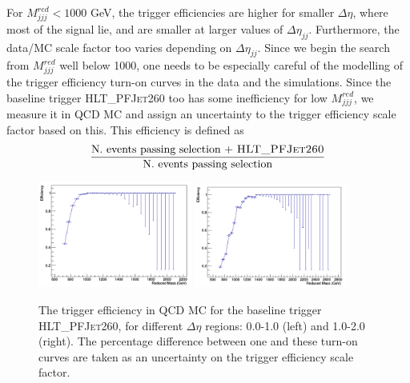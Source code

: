 For $M_{jjj}^{red} < 1000$ GeV, the trigger efficiencies are higher for smaller $\Delta\eta$, where most of the signal lie, and are smaller at larger values of $\Delta\eta_{jj}$. Furthermore, the data/MC scale factor too varies depending on $\Delta\eta_{jj}$. Since we begin the search from $M_{jjj}^{red}$ well below 1000\GeV, one needs to be especially careful of the modelling of the trigger efficiency turn-on curves in the data and the simulations. Since the baseline trigger \textsc{HLT\_PFJet260} too has some inefficiency for low $M_{jjj}^{red}$, we measure it in QCD MC and assign an uncertainty to the trigger efficiency scale factor based on this. This efficiency is defined as
\begin{equation}
\frac{\text{N. events passing selection + \textsc{HLT\_PFJet260}}}{\text{N. events passing selection}}
\end{equation}
\begin{figure}[h]
  \begin{center}  
    \includegraphics[width=0.45\textwidth]{F5/QCDDeta0v2.pdf} 
    \includegraphics[width=0.45\textwidth]{F5/QCDDeta1v2.pdf} 
  \end{center}
  \caption{The trigger efficiency in QCD MC for the baseline trigger \textsc{HLT\_PFJet260}, for different $\Delta\eta$ regions: 0.0-1.0 (left) and 1.0-2.0 (right).%
The percentage difference between one and these turn-on curves are taken as an uncertainty on the trigger efficiency scale factor.}
  \label{fig:trigeEffvsMjj_QCDHT_HLTPFJet260_DEtabins}
\end{figure}
